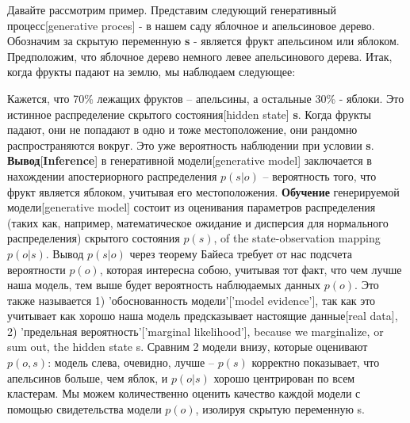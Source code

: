 \documentclass[twoside,leqno, 11pt]{article}
\begin{document}
	Давайте рассмотрим пример. Представим следующий генеративный процесс[generative proces] - в нашем саду яблочное и апельсиновое дерево. Обозначим за скрытую переменную \textbf{s} - является фрукт апельсином или яблоком. Предположим, что яблочное дерево немного левее апельсинового дерева. Итак, когда фрукты падают на землю, мы наблюдаем следующее:

	\begin{figure}[h]
		\label{ris:image}
	\end{figure}
	
	Кажется, что 70\% лежащих фруктов -- апельсины, а остальные 30\% - яблоки. Это истинное распределение скрытого состояния[hidden state] \textbf{s}. Когда фрукты падают, они не попадают в одно и тоже местоположение, они рандомно распространяются вокруг. Это уже вероятность наблюдении при условии \textbf{s}. \textbf{Вывод}[\textbf{Inference}] в генеративной модели[generative model] заключается в нахождении апостериорного распределения $p(s|o)$ -- вероятность того, что фрукт является яблоком, учитывая его местоположения. \textbf{Обучение} генерируемой модели[generative model] состоит из оценивания параметров распределения (таких как, например, математическое ожидание и дисперсия для нормального распределения) скрытого состояния $p(s)$, of the state-observation mapping $p(o|s)$. Вывод $p(s|o)$ через теорему Байеса требует от нас подсчета вероятности $p(o)$, которая интересна собою, учитывая тот факт, что чем лучше наша модель, тем выше будет вероятность наблюдаемых данных $p(o)$. Это также называется 1) 'обоснованность модели'['model evidence'], так как это учитывает как хорошо наша модель предсказывает настоящие данные[real data], 2) 'предельная вероятность'['marginal likelihood'],  because we marginalize, or sum out, the hidden state s.
	Сравним 2 модели внизу, которые оценивают $p(o,s)$: модель слева, очевидно, лучше -- $p(s)$ корректно показывает, что апельсинов больше, чем яблок, и $p(o|s)$ хорошо центрирован по всем кластерам. Мы можем количественно оценить качество каждой модели с помощью свидетельства модели $p(o)$, изолируя скрытую переменную s.
	
\end{document}

